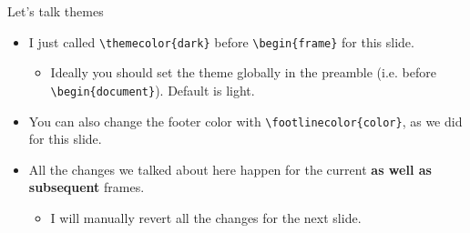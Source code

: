 \documentclass{beamer}
\begin{document}
\begin{frame}[fragile]{Let's talk themes}
\begin{itemize}
\item I just called \verb|\themecolor{dark}| before \verb|\begin{frame}| for this slide.
\begin{itemize}
    \item Ideally you should set the theme globally in the preamble (i.e. before \verb|\begin{document}|). Default is light.
\end{itemize}
\item You can also change the footer color with \verb|\footlinecolor{color}|, as we did for this slide.
\item All the changes we talked about here happen for the current \textbf{as well as subsequent} frames.
\begin{itemize}
    \item I will manually revert all the changes for the next slide.
\end{itemize}
\end{itemize}
\end{frame}


\end{document}
